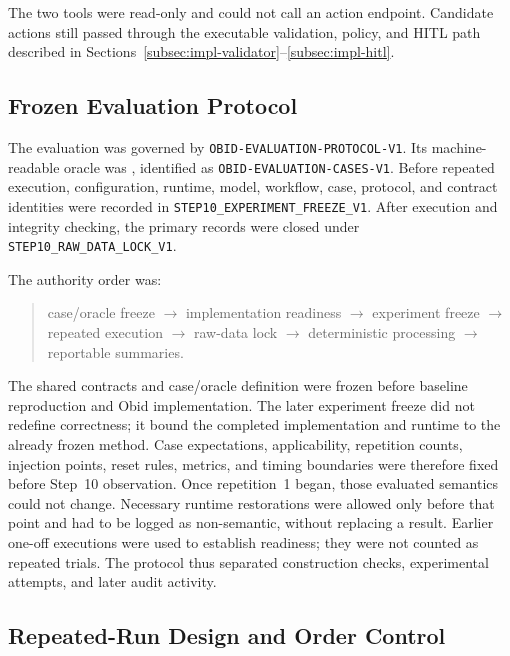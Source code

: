 The two tools were read-only and could not call an action endpoint. Candidate
actions still passed through the executable validation, policy, and HITL path
described in Sections~\ref{subsec:impl-validator}--\ref{subsec:impl-hitl}.

\subsection{Frozen Evaluation Protocol}\label{subsec:method-protocol}

The evaluation was governed by
\texttt{OBID-EVALUATION-PROTOCOL-V1}. Its machine-readable oracle was
, identified as
\texttt{OBID-EVALUATION-CASES-V1}. Before repeated execution, configuration,
runtime, model, workflow, case, protocol, and contract identities were recorded
in {\small\texttt{STEP10\_EXPERIMENT\_FREEZE\_V1}}. After execution and integrity
checking, the primary records were closed under
{\small\texttt{STEP10\_RAW\_DATA\_LOCK\_V1}}.

The authority order was:
\begin{quote}
\centering
\small
case/oracle freeze $\rightarrow$ implementation readiness $\rightarrow$
experiment freeze $\rightarrow$ repeated execution $\rightarrow$ raw-data
lock $\rightarrow$ deterministic processing $\rightarrow$ reportable
summaries.
\end{quote}

The shared contracts and case/oracle definition were frozen before baseline
reproduction and Obid implementation. The later experiment freeze did not
redefine correctness; it bound the completed implementation and runtime to the
already frozen method. Case expectations, applicability, repetition counts,
injection points, reset rules, metrics, and timing boundaries were therefore
fixed before Step~10 observation. Once repetition~1 began, those evaluated
semantics could not change. Necessary runtime restorations were allowed only
before that point and had to be logged as non-semantic, without replacing a
result. Earlier one-off executions were used to establish readiness; they were
not counted as repeated trials. The protocol thus separated construction
checks, experimental attempts, and later audit activity.

\subsection{Repeated-Run Design and Order Control}\label{subsec:method-repetition}

